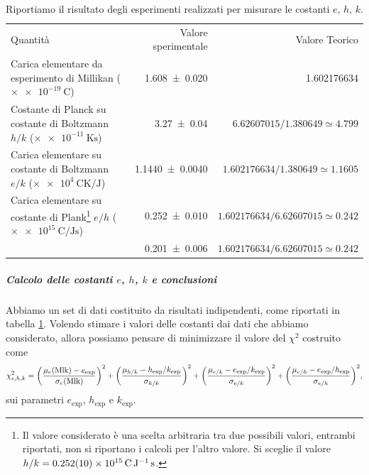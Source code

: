 \documentclass[a4paper, varvw, nofootinbib]{revtex4-2}
\begin{document}
\begin{table}
    \caption{Riportiamo il risultato degli esperimenti realizzati per misurare le costanti $e$, $h$, $k$.}\label{tab:results_indip}
    \begin{ruledtabular}
        \begin{tabular}{lrr}
            Quantità & Valore sperimentale & Valore Teorico\\\colrule
            Carica elementare da esperimento di Millikan ($\times\SI{e-19}{\coulomb}$) & \num{1.608 +- 0.020}&\num{1.602176634}\\
            Costante di Planck su costante di Boltzmann $h/k$ ($\times\SI{e-11}{\kelvin\second}$) & \num{3.27 +- 0.04} & $\num{6.62607015}/\num{1.380649}\simeq\num{4.799}$\\
            Carica elementare su costante di Boltzmann $e/k$ ($\times\SI{e4}{\coulomb\kelvin\per\joule}$) & \num{1.1440 +- 0.0040} & $\num{1.602176634}/\num{1.380649}\simeq\num{1.1605}$\\
            Carica elementare su costante di Plank\footnote{Il valore considerato è una scelta arbitraria tra due possibili valori, entrambi riportati, non si riportano i calcoli per l'altro valore. Si sceglie il valore $h/k = \SI{0.252 +- 0.010 e15}{\coulomb\per\joule\second}$.} $e/h$ ($\times\SI{e15}{\coulomb\per\joule\second}$) & \num{0.252 +- 0.010} & $\num{1.602176634} / \num{6.62607015} \simeq \num{0.242}$\\
            & \num{0.201 +- 0.006} & $\num{1.602176634} / \num{6.62607015} \simeq \num{0.242}$
        \end{tabular}
    \end{ruledtabular}
\end{table}

\subparagraph*{Calcolo delle costanti $e$, $h$, $k$ e conclusioni}\label{sec:combined_data} Abbiamo un set di dati costituito da risultati indipendenti, come riportati in tabella \ref{tab:results_indip}. Volendo stimare i valori delle costanti dai dati che abbiamo considerato, allora possiamo pensare di minimizzare il valore del $\chi^2$ costruito come \begin{equation} 
    \chi^2_{e,h,k} = 
    \qty(\frac{\mu_e(\text{Mlk}) - e_\text{exp}}{\sigma_e(\text{Mlk})})^2 + 
    \qty(\frac{\mu_{h/k} - h_\text{exp}/k_\text{exp}}{\sigma_{h/k}})^2 + 
    \qty(\frac{\mu_{e/k} - e_\text{exp}/k_\text{exp}}{\sigma_{e/k}})^2 + 
    \qty(\frac{\mu_{e/h} - e_\text{exp}/h_\text{exp}}{\sigma_{e/h}})^2, \label{eq:chi2_ehk}
\end{equation} sui parametri $e_\text{exp}$, $h_\text{exp}$ e $k_\text{exp}$.
\end{document}
